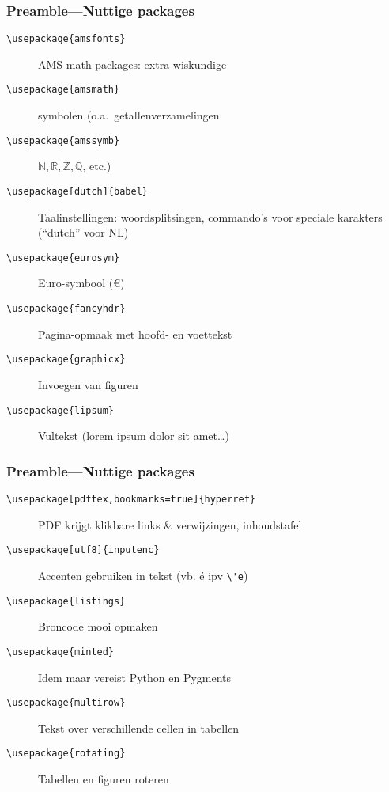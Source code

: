\documentclass[aspectratio=169]{beamer}
\begin{document}
\begin{frame}[fragile]
  \frametitle{Preamble---Nuttige packages}

  \begin{description}
    \item[\texttt{\textbackslash{}usepackage\{amsfonts\}}] AMS math packages: extra wiskundige
    \item[\texttt{\textbackslash{}usepackage\{amsmath\}}] symbolen (o.a.\ getallenverzamelingen
    \item[\texttt{\textbackslash{}usepackage\{amssymb\}}] \(\mathbb{N}, \mathbb{R}, \mathbb{Z}, \mathbb{Q}\), etc.)
    \pause{}
    \item[\texttt{\textbackslash{}usepackage[dutch]\{babel\}}] Taalinstellingen: woordsplitsingen, commando's voor speciale karakters (``dutch'' voor NL)
    \pause{}
    \item[\texttt{\textbackslash{}usepackage\{eurosym\}}] Euro-symbool (\euro)
    \pause{}
    \item[\texttt{\textbackslash{}usepackage\{fancyhdr\}}] Pagina-opmaak met hoofd- en voettekst
    \pause{}
    \item[\texttt{\textbackslash{}usepackage\{graphicx\}}] Invoegen van figuren \pause{}
    \item[\texttt{\textbackslash{}usepackage\{lipsum\}}] Vultekst (lorem ipsum dolor sit amet\ldots)
  \end{description}
\end{frame}

\begin{frame}[fragile]
  \frametitle{Preamble---Nuttige packages}

  \begin{description}
    \item[\texttt{\textbackslash{}usepackage[pdftex,bookmarks=true]\{hyperref\}}] PDF krijgt klikbare links \& verwijzingen, inhoudstafel \pause{}
    \item[\texttt{\textbackslash{}usepackage[utf8]\{inputenc\}}] Accenten gebruiken in tekst (vb. é ipv \verb|\'e|) \pause{}
    \item[\texttt{\textbackslash{}usepackage\{listings\}}] Broncode mooi opmaken \pause{}
    \item[\texttt{\textbackslash{}usepackage\{minted\}}] Idem maar vereist Python en Pygments \pause{}
    \item[\texttt{\textbackslash{}usepackage\{multirow\}}] Tekst over verschillende cellen in tabellen \pause{}
    \item[\texttt{\textbackslash{}usepackage\{rotating\}}] Tabellen en figuren roteren
  \end{description}
\end{frame}
\end{document}
